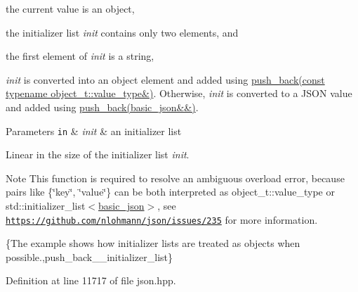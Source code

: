 \begin{DoxyEnumerate}
\item the current value is an object,
\item the initializer list {\itshape init} contains only two elements, and
\item the first element of {\itshape init} is a string,
\end{DoxyEnumerate}

{\itshape init} is converted into an object element and added using \hyperlink{classnlohmann_1_1basic__json_ae11a3a51782c058fff2f6550cdfb9b3c}{push\+\_\+back(const typename object\+\_\+t\+::value\+\_\+type\&)}. Otherwise, {\itshape init} is converted to a J\+S\+ON value and added using \hyperlink{classnlohmann_1_1basic__json_ac8e523ddc8c2dd7e5d2daf0d49a9c0d7}{push\+\_\+back(basic\+\_\+json\&\&)}.


\begin{DoxyParams}[1]{Parameters}
\mbox{\tt in}  & {\em init} & an initializer list\\
\hline
\end{DoxyParams}
Linear in the size of the initializer list {\itshape init}.

\begin{DoxyNote}{Note}
This function is required to resolve an ambiguous overload error, because pairs like {\ttfamily \{\char`\"{}key\char`\"{}, \char`\"{}value\char`\"{}\}} can be both interpreted as {\ttfamily object\+\_\+t\+::value\+\_\+type} or {\ttfamily std\+::initializer\+\_\+list$<$\hyperlink{classnlohmann_1_1basic__json}{basic\+\_\+json}$>$}, see \href{https://github.com/nlohmann/json/issues/235}{\tt https\+://github.\+com/nlohmann/json/issues/235} for more information.
\end{DoxyNote}
\{The example shows how initializer lists are treated as objects when possible.,push\+\_\+back\+\_\+\+\_\+initializer\+\_\+list\} 

Definition at line 11717 of file json.\+hpp.

